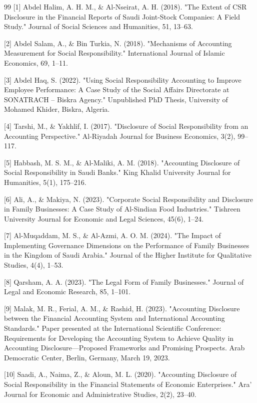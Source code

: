 \documentclass{default}
\begin{document}
\begin{thebibliography}{99}
[1] Abdel Halim, A. H. M., \& Al-Nseirat, A. H. (2018). "The Extent of CSR Disclosure in the Financial Reports of Saudi Joint-Stock Companies: A Field Study." Journal of Social Sciences and Humanities, 51, 13–63.

[2] Abdel Salam, A., \& Bin Turkia, N. (2018). "Mechanisms of Accounting Measurement for Social Responsibility." International Journal of Islamic Economics, 69, 1–11.

[3] Abdel Haq, S. (2022). "Using Social Responsibility Accounting to Improve Employee Performance: A Case Study of the Social Affairs Directorate at SONATRACH – Biskra Agency." Unpublished PhD Thesis, University of Mohamed Khider, Biskra, Algeria.

[4] Tarshi, M., \& Yakhlif, I. (2017). "Disclosure of Social Responsibility from an Accounting Perspective." Al-Riyadah Journal for Business Economics, 3(2), 99–117.

[5] Habbash, M. S. M., \& Al-Maliki, A. M. (2018). "Accounting Disclosure of Social Responsibility in Saudi Banks." King Khalid University Journal for Humanities, 5(1), 175–216.

[6] Ali, A., \& Makiya, N. (2023). "Corporate Social Responsibility and Disclosure in Family Businesses: A Case Study of Al-Sindian Food Industries." Tishreen University Journal for Economic and Legal Sciences, 45(6), 1–24.

[7] Al-Muqaddam, M. S., \& Al-Azmi, A. O. M. (2024). "The Impact of Implementing Governance Dimensions on the Performance of Family Businesses in the Kingdom of Saudi Arabia." Journal of the Higher Institute for Qualitative Studies, 4(4), 1–53.

[8] Qarsham, A. A. (2023). "The Legal Form of Family Businesses." Journal of Legal and Economic Research, 85, 1–101.

[9] Malak, M. R., Ferial, A. M., \& Rashid, H. (2023). "Accounting Disclosure between the Financial Accounting System and International Accounting Standards." Paper presented at the International Scientific Conference: Requirements for Developing the Accounting System to Achieve Quality in Accounting Disclosure—Proposed Frameworks and Promising Prospects. Arab Democratic Center, Berlin, Germany, March 19, 2023.

[10] Saadi, A., Naima, Z., \& Aloun, M. L. (2020). "Accounting Disclosure of Social Responsibility in the Financial Statements of Economic Enterprises." Ara’ Journal for Economic and Administrative Studies, 2(2), 23–40.


\end{thebibliography}
\end{document}
